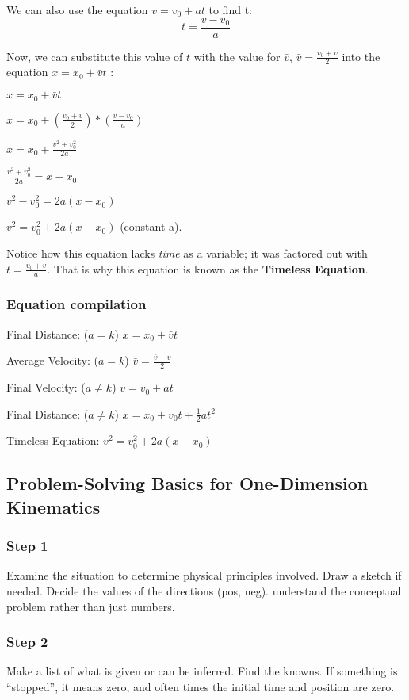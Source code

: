 \documentclass{article}
\begin{document}
We can also use the equation $v = v_0 + at$ to find t:
\[t = \frac{v - v_0}{a}\]

Now, we can substitute this value of $t$ with the value for $\bar{v}$, $\bar{v} = \frac{v_0 + v}{2}$ into the equation $x = x_0 + \bar{v}t$ :

$x = x_0 + \bar{v}t$

$x = x_0 + (\frac{v_0 + v}{2}) * (\frac{v - v_0}{a})$

$x = x_0 + \frac{v^2 + v_0^2}{2a}$

$\frac{v^2 + v_0^2}{2a} = x - x_0$

$v^2 - v_0^2 = 2a(x - x_0)$

$v^2 = v_0^2+ 2a(x - x_0)$ (constant a).

 Notice how this equation lacks \emph{time} as a variable; it was factored out with $t = \frac{v_0 + v}{a}$. That is why this equation is known as the \textbf{Timeless Equation}.

 \subsubsection{Equation compilation}

Final Distance: ($a=k$) $x = x_0 + \bar{v}t$

 Average Velocity: ($a=k$) $\bar{v} = \frac{\bar{v} + v}{2}$

Final Velocity: ($a\neq k$) $v = v_0 + at$

Final Distance: ($a \neq k$) $x = x_0 + v_0 t + \frac{1}{2}at^2$

Timeless Equation: $v^2 = v_0^2 + 2a(x - x_0)$ 
 
\subsection{Problem-Solving Basics for One-Dimension Kinematics}

\subsubsection{Step 1}
Examine the situation to determine physical principles involved. Draw a sketch if needed. Decide the values of the directions (pos, neg). understand the conceptual problem rather than just numbers.
\subsubsection{Step 2}
Make a list of what is given or can be inferred. Find the knowns. If something is ``stopped'', it means zero, and often times the initial time and position are zero.
\end{document}
